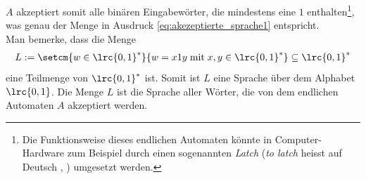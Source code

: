 $A$ akzeptiert somit alle binären Eingabewörter, die mindestens eine $1$ enthalten\footnote{Die Funktionsweise dieses endlichen Automaten könnte in Computer-Hardware zum Beispiel durch einen sogenannten \textit{Latch} (\textit{to latch} heisst auf Deutsch , ) umgesetzt werden.}, was genau der Menge in Ausdruck \cref{eq:akezeptierte_sprache1} entspricht.\\

\noindent
Man bemerke, dass die Menge
\begin{align}\label{eq:L}
	L := \setcm{w\in\lrc{0,1}^*}{w = x1y\;\text{mit}\;x,y\in\lrc{0,1}^*} \subseteq \lrc{0,1}^*
\end{align}
eine Teilmenge von $\lrc{0,1}^*$ ist. Somit ist $L$ eine Sprache über dem Alphabet $\lrc{0,1}$. Die Menge $L$ ist die Sprache aller Wörter, die von dem endlichen Automaten $A$ akzeptiert werden.\\

